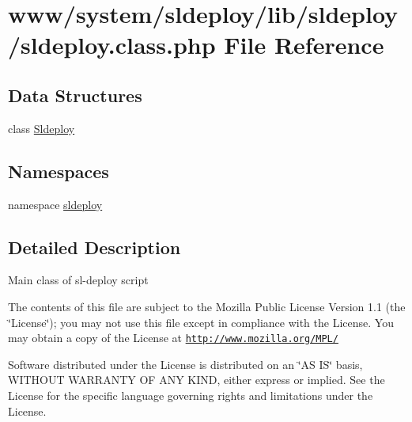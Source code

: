 \hypertarget{sldeploy_8class_8php}{
\section{www/system/sldeploy/lib/sldeploy/sldeploy.class.php File Reference}
\label{sldeploy_8class_8php}
}
\subsection*{Data Structures}
\begin{DoxyCompactItemize}
\item 
class \hyperlink{class_sldeploy}{Sldeploy}
\end{DoxyCompactItemize}
\subsection*{Namespaces}
\begin{DoxyCompactItemize}
\item 
namespace \hyperlink{namespacesldeploy}{sldeploy}
\end{DoxyCompactItemize}


\subsection{Detailed Description}
Main class of sl-\/deploy script

The contents of this file are subject to the Mozilla Public License Version 1.1 (the \char`\"{}License\char`\"{}); you may not use this file except in compliance with the License. You may obtain a copy of the License at \href{http://www.mozilla.org/MPL/}{\tt http://www.mozilla.org/MPL/}

Software distributed under the License is distributed on an \char`\"{}AS IS\char`\"{} basis, WITHOUT WARRANTY OF ANY KIND, either express or implied. See the License for the specific language governing rights and limitations under the License. 